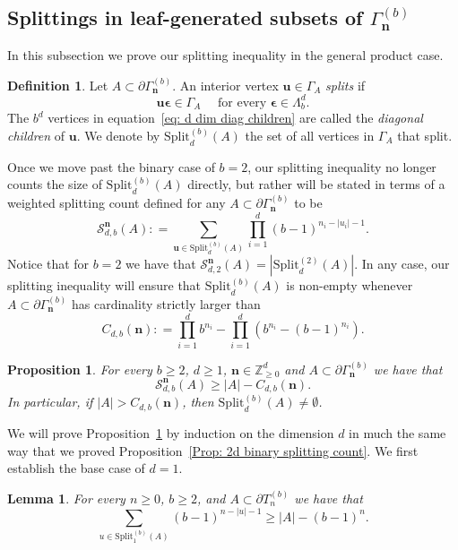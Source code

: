 \documentclass[11pt]{amsart}
\newcommand{\Z}{\mathbb{Z}}  %
\newcommand\labs[1]{\left\lvert#1\right\rvert}
\newcommand{\Split}{\mathrm{Split}}
\renewcommand{\geq}{\geqslant}
\theoremstyle{plain}
\newtheorem{lem}[thm]{Lemma}
\newtheorem{pro}[thm]{Proposition}
\theoremstyle{definition}
\newtheorem{defn}[thm]{Definition}
\theoremstyle{remark}
\begin{document}
\subsection{Splittings in leaf-generated subsets of \texorpdfstring{$\Gamma_{\mathbf{n}}^{(b)}$}{Gamma(n,b)}}
In this subsection we prove our splitting inequality in the general product case.
\begin{defn}
Let $A\subset \partial \Gamma_{\mathbf{n}}^{(b)}$. An interior vertex $\mathbf{u} \in \Gamma_A$ \textit{splits} if
\begin{equation}\label{eq: d dim diag children}
\mathbf{u}\bm{\epsilon} \in \Gamma_A \quad \text{ for every }\bm{\epsilon} \in \Lambda_b^d.
\end{equation}
The $b^d$ vertices in equation~\eqref{eq: d dim diag children} are called the \textit{diagonal children} of $\mathbf{u}$. We denote by $\Split_d^{(b)}(A)$ the set of all vertices in $\Gamma_A$ that split.
\end{defn}
Once we move past the binary case of $b=2$, our splitting inequality no longer counts the size of $\Split_d^{(b)}(A)$ directly, but rather will be stated in terms of a weighted splitting count defined for any $A\subset \partial \Gamma_{\mathbf{n}}^{(b)}$ to be
\[ \mathcal{S}_{d,b}^{\mathbf{n}}(A): = \sum_{\mathbf{u} \in \Split_d^{(b)}(A)} \prod_{i=1}^{d} \left(b-1\right)^{n_i - \labs{u_i}-1}.\]
Notice that for $b=2$ we have that $\mathcal{S}_{d,2}^{\mathbf{n}}(A) = \labs{\Split_d^{(2)}(A)}$. In any case, our splitting inequality will ensure that $\Split_d^{(b)}(A)$ is non-empty whenever $A\subset \partial \Gamma_{\mathbf{n}}^{(b)}$ has cardinality strictly larger than
\begin{equation}\label{eq: general cutoff}
C_{d,b}(\mathbf{n}): = \prod_{i=1}^d b^{n_i} - \prod_{i=1}^{d}\left(b^{n_i} - (b-1)^{n_i}\right).\end{equation}
\begin{pro}\label{Prop: General splitting lemma}
For every $b\geq 2$, $d\geq 1$, $\mathbf{n}\in \Z_{\geq 0}^d$ and $A\subset \partial \Gamma_{\mathbf{n}}^{(b)}$ we have that
\[ \mathcal{S}_{d,b}^{\mathbf{n}}(A) \geq \labs{A} - C_{d,b}(\mathbf{n}).\]
In particular, if $\labs{A}> C_{d,b}(\mathbf{n})$, then $\Split_d^{(b)}(A) \neq \emptyset$.
\end{pro}
We will prove Proposition~\ref{Prop: General splitting lemma} by induction on the dimension $d$ in much the same way that we proved Proposition~\ref{Prop: 2d binary splitting count}. We first establish the base case of $d=1$.
\begin{lem}\label{Lem: 1d b-ary base case}
For every $n\geq 0$, $b\geq 2$, and $A\subset \partial T_n^{(b)}$ we have that
\[ \sum_{u \in \Split_1^{(b)}(A)} (b-1)^{n-\labs{u}-1} \geq \labs{A} -(b-1)^n.\] 
\end{lem}
\end{document}
